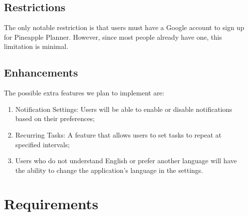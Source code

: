 \documentclass{article}
\begin{document}
\subsection{Restrictions}
The only notable restriction is that users must have a Google account to sign up for Pineapple Planner. However, since most people already have one, this limitation is minimal.
\subsection{Enhancements}


The possible extra features we plan to implement are:
\begin{enumerate}
  \item Notification Settings: Users will be able to enable or disable notifications based on their preferences;
  \item Recurring Tasks: A feature that allows users to set tasks to repeat at specified intervals;
  \item Users who do not understand English or prefer another language will have the ability to change the application's language in the settings.
\end{enumerate} 


\section{Requirements}
\end{document}

